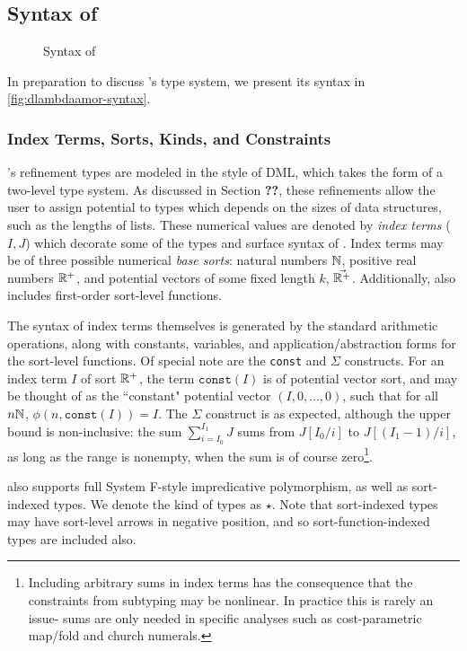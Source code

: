 \subsection{Syntax of \dlambdaamor}
\begin{figure}

\caption{Syntax of \dlambdaamor}
\label{fig:dlambdaamor-syntax}
\end{figure}

In preparation to discuss \dlambdaamor's type system, we present its syntax in \autoref{fig:dlambdaamor-syntax}.

\subsubsection{Index Terms, Sorts, Kinds, and Constraints}
\dlambdaamor's refinement types are modeled in the style of DML, which takes the form of a two-level type system. As discussed in Section \textbf{??}, these refinements allow the user to assign potential to types which depends on the sizes of data structures, such as the lengths of lists. These numerical values are denoted by \textit{index terms} ($I,J$) which decorate some of the types and surface syntax of \dlambdaamor. Index terms may be of three possible numerical \textit{base sorts}: natural numbers $\mathbb{N}$, positive real numbers $\mathbb{R}^+$, and potential vectors of some fixed length $k$, $\vec{\mathbb{R}^+}$. Additionally, \dlambdaamor also includes first-order sort-level functions.

The syntax of index terms themselves is generated by the standard arithmetic operations, along with constants, variables, and application/abstraction forms for the sort-level functions. Of special note are the \texttt{const} and $\Sigma$ constructs. For an index term $I$ of sort $\mathbb{R}^+$, the term $\texttt{const}(I)$ is of potential vector sort, and may be thought of as the ``constant" potential vector $(I,0,\dots,0)$, such that for all $n \mathbb{N}$, $\phi(n,\texttt{const}(I)) = I$.
The $\Sigma$ construct is as expected, although the upper bound is non-inclusive: the sum $\sum_{i=I_0}^{I_1} J$ sums from $J[I_0/i]$ to $J[(I_1-1)/i]$, as long as the range is nonempty, when the sum is of course zero\footnote{
Including arbitrary sums in index terms has the consequence that the constraints from subtyping may be nonlinear. In practice this is rarely an issue- sums are only needed in specific analyses such as cost-parametric map/fold and church numerals.
}.

\dlambdaamor also supports full System F-style impredicative polymorphism, as well as sort-indexed types. We denote the kind of types as $\star$. Note that sort-indexed types may have sort-level arrows in negative position, and so sort-function-indexed types are included also.

